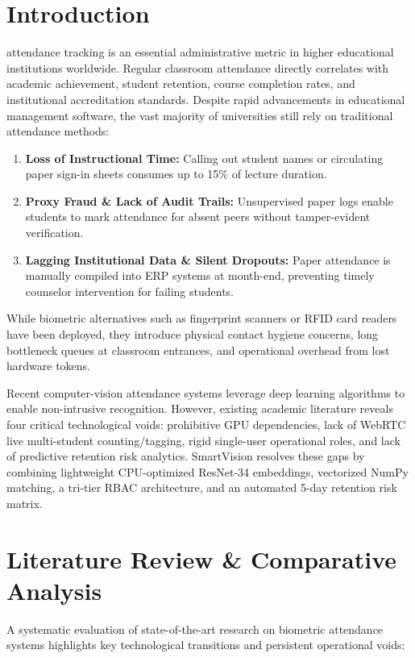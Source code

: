 \documentclass[10pt,journal,compsoc,twocolumn,a4paper]{IEEEtran}
\begin{document}
\section{Introduction}
 attendance tracking is an essential administrative metric in higher educational institutions worldwide. Regular classroom attendance directly correlates with academic achievement, student retention, course completion rates, and institutional accreditation standards. Despite rapid advancements in educational management software, the vast majority of universities still rely on traditional attendance methods:
\begin{enumerate}
    \item \textbf{Loss of Instructional Time:} Calling out student names or circulating paper sign-in sheets consumes up to 15\% of lecture duration.
    \item \textbf{Proxy Fraud \& Lack of Audit Trails:} Unsupervised paper logs enable students to mark attendance for absent peers without tamper-evident verification.
    \item \textbf{Lagging Institutional Data \& Silent Dropouts:} Paper attendance is manually compiled into ERP systems at month-end, preventing timely counselor intervention for failing students.
\end{enumerate}

While biometric alternatives such as fingerprint scanners or RFID card readers have been deployed, they introduce physical contact hygiene concerns, long bottleneck queues at classroom entrances, and operational overhead from lost hardware tokens.

Recent computer-vision attendance systems leverage deep learning algorithms to enable non-intrusive recognition. However, existing academic literature reveals four critical technological voids: prohibitive GPU dependencies, lack of WebRTC live multi-student counting/tagging, rigid single-user operational roles, and lack of predictive retention risk analytics. SmartVision resolves these gaps by combining lightweight CPU-optimized ResNet-34 embeddings, vectorized NumPy matching, a tri-tier RBAC architecture, and an automated 5-day retention risk matrix.

\section{Literature Review \& Comparative Analysis}
A systematic evaluation of state-of-the-art research on biometric attendance systems highlights key technological transitions and persistent operational voids:
\end{document}
